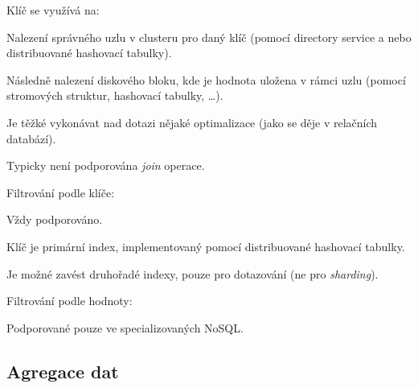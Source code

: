 \begin{compactitem}
    \item Klíč se využívá na: \begin{compactitem}
        \item Nalezení správného uzlu v clusteru pro daný klíč (pomocí directory service a nebo distribuované hashovací tabulky).

        \item Následně nalezení diskového bloku, kde je hodnota uložena v rámci uzlu (pomocí stromových struktur, hashovací tabulky, \dots).
    \end{compactitem}

    \item Je těžké vykonávat nad dotazi nějaké optimalizace (jako se děje v relačních databází).

    \item Typicky není podporována \textit{join} operace.

    \item Filtrování podle klíče: \begin{compactitem}
        \item Vždy podporováno.
        \item Klíč je primární index, implementovaný pomocí distribuované hashovací tabulky.
        \item Je možné zavést druhořadé indexy, pouze pro dotazování (ne pro \textit{sharding}).
    \end{compactitem}

    \item Filtrování podle hodnoty: \begin{compactitem}
        \item Podporované pouze ve specializovaných NoSQL.
    \end{compactitem}
\end{compactitem}

\subsection{Agregace dat}


